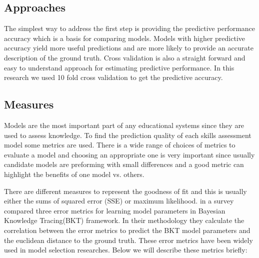\subsection{Approaches}
The simplest way to address the first step is providing the predictive performance accuracy which is a basis for comparing models. Models with higher predictive accuracy yield more useful predictions and are more likely to provide an accurate description of the ground truth. Cross validation is also a straight forward and easy to understand approach for estimating predictive performance. In this research we used 10 fold cross validation to get the predictive accuracy.


\subsection{Measures}

Models are the most important part of any educational systems since they are used to assess knowledge. To find the prediction quality of each skills assessment model some metrics are used. There is a wide range of choices of metrics to evaluate a model and choosing an appropriate one is very important since usually candidate models are preforming with small differences and a good metric can highlight the benefits of one model vs. others.



There are different measures to represent the goodness of fit and this is usually either the sums of squared error (SSE) or maximum likelihood. \citet{dhanani2014comparison} in a survey compared three error metrics for learning model parameters in Bayesian Knowledge Tracing(BKT) framework. In their methodology they calculate the correlation between the error metrics to predict the BKT model parameters and the euclidean distance to the ground truth.  These error metrics have been widely used in model selection researches. Below we will describe these metrics briefly:

